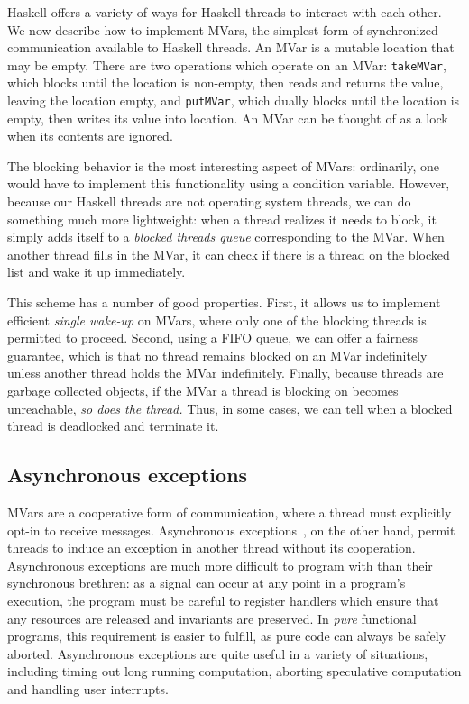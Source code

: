 Haskell offers a variety of ways for Haskell threads to interact with
each other.  We now describe how to implement MVars, the simplest form
of synchronized communication available to Haskell threads.  An MVar is
a mutable location that may be empty.  There are two operations which
operate on an MVar: \verb|takeMVar|, which blocks until the location is
non-empty, then reads and returns the value, leaving the location empty,
and \verb|putMVar|, which dually blocks until the location is empty,
then writes its value into location.  An MVar can be thought of as a
lock when its contents are ignored.

The blocking behavior is the most interesting aspect of MVars:
ordinarily, one would have to implement this functionality using a
condition variable.  However, because our Haskell threads are not
operating system threads, we can do something much more lightweight:
when a thread realizes it needs to block, it simply adds itself to a
\emph{blocked threads queue} corresponding to the MVar.  When another
thread fills in the MVar, it can check if there is a thread on the
blocked list and wake it up immediately.

This scheme has a number of good properties.  First, it allows us
to implement efficient \emph{single wake-up} on MVars, where only one of
the blocking threads is permitted to proceed. Second, using a FIFO
queue, we can offer a fairness guarantee, which is that no thread
remains blocked on an MVar indefinitely unless another thread holds the
MVar indefinitely.  Finally, because threads are garbage collected
objects, if the MVar a thread is blocking on becomes unreachable,
\emph{so does the thread.}  Thus, in some cases, we can tell when
a blocked thread is deadlocked and terminate it.

\subsection{Asynchronous exceptions}
\label{sec:asynchronous-exceptions}

MVars are a cooperative form of communication, where a thread must
explicitly opt-in to receive messages.  Asynchronous
exceptions~\cite{Marlow:2001:AEH:378795.378858}, on the other hand,
permit threads to induce an exception in another thread without its
cooperation.  Asynchronous exceptions are much more difficult to program
with than their synchronous brethren: as a signal can occur at any point
in a program's execution, the program must be careful to register
handlers which ensure that any resources are released and invariants are
preserved.  In \emph{pure} functional programs, this requirement is
easier to fulfill, as pure code can always be safely aborted.
Asynchronous exceptions are quite useful in a variety of situations,
including timing out long running computation, aborting speculative
computation and handling user interrupts.

